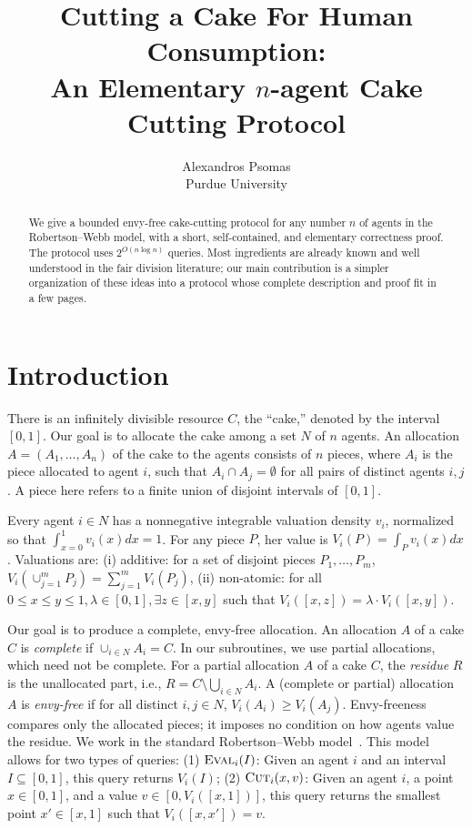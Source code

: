 \documentclass[11pt]{article}
\title{Cutting a Cake For Human Consumption:\\An Elementary $n$-agent Cake Cutting Protocol}
\author{Alexandros Psomas \\ Purdue University}
\date{}
\newcommand{\alloc}{A}
\theoremstyle{plain}
\theoremstyle{definition}
\theoremstyle{plain}
\begin{document}
\maketitle

\begin{abstract}
We give a bounded envy-free cake-cutting protocol for any number $n$ of agents in the Robertson--Webb model, with a short, self-contained, and elementary correctness proof. The protocol uses $2^{O(n \log n)}$ queries. Most ingredients are already known and well understood in the fair division literature; our main contribution is a simpler organization of these ideas into a protocol whose complete description and proof fit in a few pages.
\end{abstract}


\section{Introduction}\label{sec:intro}

There is an infinitely divisible resource $C$, the ``cake,'' denoted by the interval $[0,1]$. Our goal is to allocate the cake among a set $N$ of $n$ agents. An allocation $\alloc = (\alloc_1, \dots, \alloc_n)$ of the cake to the agents consists of $n$ pieces, where $\alloc_i$ is the piece allocated to agent $i$, such that $\alloc_i \cap \alloc_j = \emptyset$ for all pairs of distinct agents $i,j$. A piece here refers to a finite union of disjoint intervals of $[0,1]$.

Every agent $i \in N$ has a nonnegative integrable valuation density $v_i$, normalized so that $\int_{x=0}^1 v_i(x) dx = 1$. For any piece $P$, her value is $V_i(P) = \int_P v_i(x) dx$. Valuations are: (i) additive: for a set of disjoint pieces $P_1, \dots, P_m$, $V_i (\cup_{j=1}^m P_j) = \sum_{j=1}^m V_i(P_j)$, (ii) non-atomic: for all $0 \leq x \leq y \leq 1, \lambda \in [0,1], \exists z \in [x, y]$ such that $V_i([x, z]) = \lambda \cdot V_i([x,y])$.


Our goal is to produce a complete, envy-free allocation. An allocation $\alloc$ of a cake $C$ is \emph{complete} if $\cup_{i \in N} \alloc_i = C$. In our subroutines, we use partial allocations, which need not be complete. For a partial allocation $\alloc$ of a cake $C$, the \emph{residue} $R$ is the unallocated part, i.e., $R = C \setminus \bigcup_{i \in N} \alloc_i$. A (complete or partial) allocation $\alloc$ is \emph{envy-free} if for all distinct $i,j \in N$, $V_i(\alloc_i) \geq V_i(\alloc_j)$. Envy-freeness compares only the allocated pieces; it imposes no condition on how agents value the residue. We work in the standard Robertson--Webb model~\cite{robertson1998cake,woeginger2007complexity}. This model allows for two types of queries: (1) $\textsc{Eval}_i(I)$: Given an agent $i$ and an interval $I \subseteq [0,1]$, this query returns $V_i(I)$; (2) $\textsc{Cut}_i(x, v)$: Given an agent $i$, a point $x \in [0,1]$, and a value $v \in [0,V_i([x,1])]$, this query returns the smallest point $x' \in [x, 1]$ such that $V_i([x, x']) = v$. 
\end{document}

